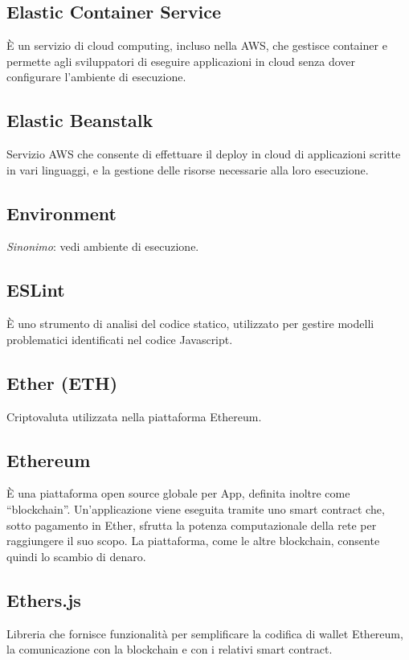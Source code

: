 \section[E]{}
	\subsection*{Elastic Container Service}
	È un servizio di cloud computing, incluso nella AWS, che gestisce container e permette agli sviluppatori di eseguire applicazioni in cloud senza dover configurare l’ambiente di esecuzione.
	\subsection*{Elastic Beanstalk}
	Servizio AWS che consente di effettuare il deploy in cloud di applicazioni scritte in vari linguaggi, e la gestione delle risorse necessarie alla loro esecuzione.
	\subsection*{Environment}
	\emph{Sinonimo}: vedi ambiente di esecuzione.
	\subsection*{ESLint}
	È uno strumento di analisi del codice statico, utilizzato per gestire modelli problematici identificati nel codice Javascript.
	\subsection*{Ether (ETH)}
	Criptovaluta utilizzata nella piattaforma Ethereum.
	\subsection*{Ethereum}
	È una piattaforma open source globale per \DJ{}App, definita inoltre come “blockchain”. Un’applicazione viene eseguita tramite uno smart contract che, sotto pagamento in Ether, sfrutta la potenza computazionale della rete per raggiungere il suo scopo. La piattaforma, come le altre blockchain, consente quindi lo scambio di denaro.
	\subsection*{Ethers.js}
	Libreria che fornisce funzionalità per semplificare la codifica di wallet Ethereum, la comunicazione con la blockchain e con i relativi smart contract.
